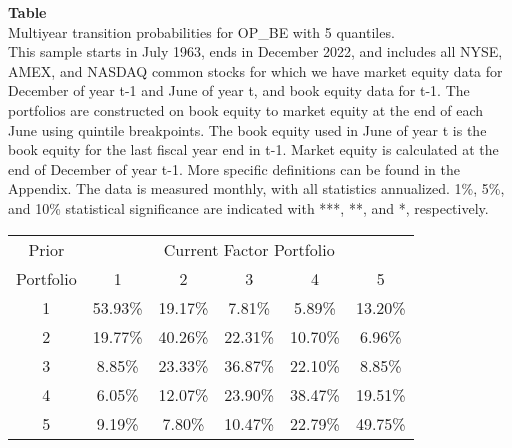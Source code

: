 \begin{table*}[ht!]
\raggedright
{}
\label{tab: multiyear_transition_probs_OP_BE_with_5_quantiles}
\textbf{Table \thetable} \\
Multiyear transition probabilities for OP_BE with 5 quantiles. \\
\hspace*{1em}This sample starts in July 1963, ends in December 2022, and includes all NYSE, AMEX, and NASDAQ common stocks for which we have market equity data for December of year t-1 and June of year t, and book equity data for t-1. The portfolios are constructed on book equity to market equity at the end of each June using quintile breakpoints.  The book equity used in June of year t is the book equity for the last fiscal year end in t-1.  Market equity is calculated at the end of December of year t-1.  More specific definitions can be found in the Appendix.  The data is measured monthly, with all statistics annualized.  1\%, 5\%, and 10\% statistical significance are indicated with ***, **, and *, respectively. \\
\vspace{0.5em}
\centering
\begin{adjustbox}{max width=\textwidth}
\begin{tabular}{@{}cccccc@{}}
\toprule
Prior & \multicolumn{5}{c}{Current Factor Portfolio} \\
Portfolio & 1 & 2 & 3 & 4 & 5 \\
\midrule
1 & 53.93\% & 19.17\% & 7.81\% & 5.89\% & 13.20\% \\
2 & 19.77\% & 40.26\% & 22.31\% & 10.70\% & 6.96\% \\
3 & 8.85\% & 23.33\% & 36.87\% & 22.10\% & 8.85\% \\
4 & 6.05\% & 12.07\% & 23.90\% & 38.47\% & 19.51\% \\
5 & 9.19\% & 7.80\% & 10.47\% & 22.79\% & 49.75\% \\
\bottomrule
\end{tabular}
\end{adjustbox}
\end{table*}
